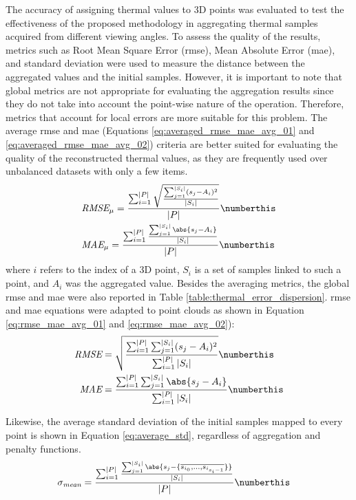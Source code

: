 The accuracy of assigning thermal values to 3D points was evaluated to test the effectiveness of the proposed methodology in aggregating thermal samples acquired from different viewing angles. To assess the quality of the results, metrics such as Root Mean Square Error (\acrshort{rmse}), Mean Absolute Error (\acrshort{mae}), and standard deviation were used to measure the distance between the aggregated values and the initial samples. However, it is important to note that global metrics are not appropriate for evaluating the aggregation results since they do not take into account the point-wise nature of the operation. Therefore, metrics that account for local errors are more suitable for this problem. The average \acrshort{rmse} and \acrshort{mae} (Equations \ref{eq:averaged_rmse_mae_avg_01} and \ref{eq:averaged_rmse_mae_avg_02}) criteria are better suited for evaluating the quality of the reconstructed thermal values, as they are frequently used over unbalanced datasets with only a few items.
\begin{align*}
    &\textit{RMSE}_{\mu} = \frac{\sum_{i=1}^{|P|} \sqrt{\frac{\sum_{j=1}^{|S_i|} (s_j - A_i)^2}{|S_i|}}}{|P|}
    \numberthis \label{eq:averaged_rmse_mae_avg_01}\\
    &\textit{MAE}_{\mu} = \frac{\sum_{i=1}^{|P|} \frac{\sum_{j=1}^{|S_i|} \abs{s_j - A_i}}{|S_i|}}{|P|}
    \numberthis \label{eq:averaged_rmse_mae_avg_02}
\end{align*}
where $i$ refers to the index of a 3D point, $S_i$ is a set of samples linked to such a point, and $A_i$ was the aggregated value. Besides the averaging metrics, the global \acrshort{rmse} and \acrshort{mae} were also reported in Table \ref{table:thermal_error_dispersion}. \acrshort{rmse} and \acrshort{mae} equations were adapted to point clouds as shown in Equation \ref{eq:rmse_mae_avg_01} and \ref{eq:rmse_mae_avg_02}):
\begin{align*}
    \textit{RMSE} &= \sqrt{\frac{\sum_{i=1}^{|P|} \sum_{j=1}^{|S_i|} (s_j - A_i)^2}{\sum_{i=1}^{|P|} |S_i|}}
    \numberthis \label{eq:rmse_mae_avg_01}\\
    \textit{MAE} &= \frac{\sum_{i=1}^{|P|} \sum_{j=1}^{|S_i|} \abs{s_j - A_i}}{\sum_{i=1}^{|P|} |S_i|}
    \numberthis \label{eq:rmse_mae_avg_02}
\end{align*}

Likewise, the average standard deviation of the initial samples mapped to every point is shown in Equation \ref{eq:average_std}, regardless of aggregation and penalty functions. 
\begin{align*}
    &\sigma_{\textit{mean}} = \frac{\sum_{i=1}^{|P|} \frac{\sum_{j=1}^{|S_i|} \abs{s_j - \{\overline{s_{i_0},...,s_{i_{s_i-1}}}\}}}{|S_i|}}{|P|} 
    \numberthis \label{eq:average_std}
\end{align*}

